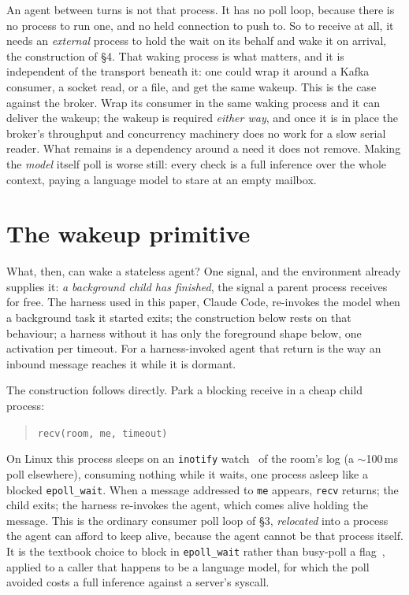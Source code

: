 \documentclass[11pt]{article}
\newcommand{\code}[1]{\texttt{#1}}
\begin{document}
An agent between turns is not that process. It has no poll loop, because there is no process to run one, and no held connection to push to. So to receive at all, it needs an \emph{external} process to hold the wait on its behalf and wake it on arrival, the construction of \S4. That waking process is what matters, and it is independent of the transport beneath it: one could wrap it around a Kafka consumer, a socket read, or a file, and get the same wakeup. This is the case against the broker. Wrap its consumer in the same waking process and it can deliver the wakeup; the wakeup is required \emph{either way}, and once it is in place the broker's throughput and concurrency machinery does no work for a slow serial reader. What remains is a dependency around a need it does not remove. Making the \emph{model} itself poll is worse still: every check is a full inference over the whole context, paying a language model to stare at an empty mailbox.

\section{The wakeup primitive}

What, then, can wake a stateless agent? One signal, and the environment already supplies it: \emph{a background child has finished}, the signal a parent process receives for free. The harness used in this paper, Claude Code, re-invokes the model when a background task it started exits; the construction below rests on that behaviour; a harness without it has only the foreground shape below, one activation per timeout. For a harness-invoked agent that return is the way an inbound message reaches it while it is dormant.

The construction follows directly. Park a blocking receive in a cheap child process:
\begin{quote}
\code{recv(room, me, timeout)}
\end{quote}
On Linux this process sleeps on an \code{inotify} watch~\cite{kerrisk2010} of the room's log (a $\sim$100\,ms poll elsewhere), consuming nothing while it waits, one process asleep like a blocked \code{epoll\_wait}. When a message addressed to \code{me} appears, \code{recv} returns; the child exits; the harness re-invokes the agent, which comes alive holding the message. This is the ordinary consumer poll loop of \S3, \emph{relocated} into a process the agent can afford to keep alive, because the agent cannot be that process itself. It is the textbook choice to block in \code{epoll\_wait} rather than busy-poll a flag~\cite{kerrisk2010,pai1999}, applied to a caller that happens to be a language model, for which the poll avoided costs a full inference against a server's syscall.
\end{document}
